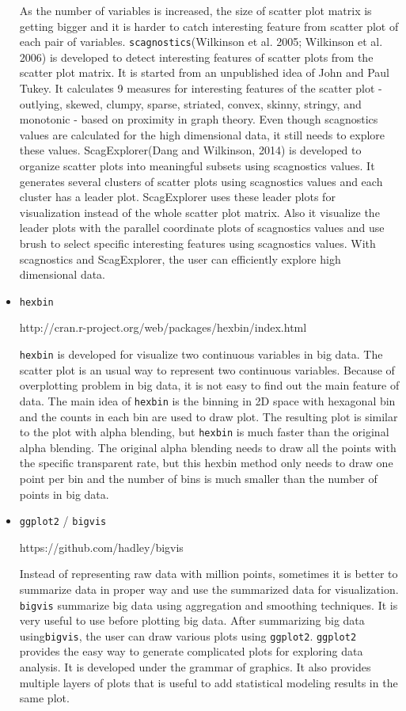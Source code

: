 \documentclass{article}
\begin{document}
\begin{itemize}
As the number of variables is increased, the size of scatter plot matrix is getting bigger and  it is  harder to catch interesting feature from scatter plot of each pair of variables. {\tt scagnostics}(Wilkinson et al. 2005; Wilkinson et al. 2006) is developed to detect interesting features of scatter plots from the scatter plot matrix. It is started from an unpublished idea of John and Paul Tukey. It calculates 9 measures for interesting features of the scatter plot - outlying, skewed, clumpy, sparse, striated, convex, skinny, stringy, and monotonic - based on proximity in graph theory. Even though scagnostics values are calculated for the high dimensional data, it still needs to explore these values.
ScagExplorer(Dang and Wilkinson, 2014) is developed to organize scatter plots into meaningful subsets using scagnostics values. It generates several clusters of scatter plots using scagnostics values and each cluster has a leader plot. ScagExplorer uses these leader plots for visualization instead of the whole scatter plot matrix. Also it visualize the leader plots with the parallel coordinate plots of scagnostics values and use brush to select specific interesting features using scagnostics values. With scagnostics and ScagExplorer, the user can efficiently explore high dimensional data.

\item {\tt hexbin }

http://cran.r-project.org/web/packages/hexbin/index.html

{\tt hexbin} is developed for visualize two continuous variables in big data. The scatter plot is an usual way to represent two continuous variables. Because of overplotting problem in big data, it is not easy to find out the main feature of data. The main idea of {\tt hexbin} is the binning in 2D space with hexagonal bin and the counts in each bin are used to draw plot. The resulting plot is similar to the plot with alpha blending, but {\tt hexbin} is much faster than the original alpha blending. The original alpha blending needs to draw all the points with the specific transparent rate, but this hexbin method only needs to draw one point per bin and the number of bins is much smaller than the number of points in big data.

\item {\tt ggplot2} / {\tt bigvis}

https://github.com/hadley/bigvis

Instead of representing raw data with million points, sometimes it is better to summarize data in  proper way and use the summarized data for visualization. {\tt bigvis} summarize big data using aggregation and smoothing techniques. It is very useful to use before plotting big data. After summarizing big data using{\tt bigvis}, the user can draw various plots using {\tt ggplot2}. {\tt ggplot2} provides the easy way to generate complicated plots for exploring data analysis. It is developed under the grammar of graphics. It also provides multiple layers of plots that is useful to add statistical modeling results in the same plot.


\end{itemize}
\end{document}
